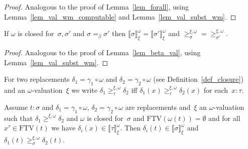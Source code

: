 \documentclass[a4paper,UKenglish,cleveref,autoref,numberwithinsect]{lipics-v2019}
\theoremstyle{definition}
\newcommand{\FTV}{\mathrm{FTV}}
\newcommand{\val}[3]{\ensuremath{\llbracket#1\rrbracket_{#2}^{#3}}}
\newcommand{\gteq}[3]{\ensuremath{\ge_{#1}^{#2,#3}}}
\begin{document}
\begin{proof}
  Analogous to the proof of Lemma~\ref{lem_forall}, using
  Lemma~\ref{lem_val_wm_computable} and Lemma~\ref{lem_val_subst_wm}.
\end{proof}

\begin{lemma}\label{lem_beta_val_wm}
  If $\omega$ is closed for~$\sigma,\sigma'$ and $\sigma =_\beta
  \sigma'$ then $\val{\sigma}{\xi}{\omega} =
  \val{\sigma'}{\xi}{\omega}$ and ${\gteq{\sigma}{\xi}{\omega}} =
      {\gteq{\sigma'}{\xi}{\omega}}$.
\end{lemma}

\begin{proof}
  Analogous to the proof of Lemma~\ref{lem_beta_val}, using
  Lemma~\ref{lem_val_subst_wm}.
\end{proof}

For two replacements $\delta_1 = \gamma_1 \circ \omega$ and $\delta_2
= \gamma_2 \circ \omega$ (see Definition~\ref{def_closure}) and an
$\omega$-valuation~$\xi$ we write $\delta_1 \gteq{\tau}{\xi}{\omega}
\delta_2$ iff $\delta_1(x) \gteq{\tau}{\xi}{\omega} \delta_2(x)$ for
each~$x : \tau$.

\begin{lemma}\label{lem_typable_wm_computable}
  Assume $t : \sigma$ and $\delta_1=\gamma_1\circ\omega$,
  $\delta_2=\gamma_2\circ\omega$ are replacements and~$\xi$ an
  $\omega$-valuation such that $\delta_1 \gteq{}{\xi}{\omega}
  \delta_2$ and $\omega$ is closed for~$\sigma$ and $\FTV(\omega(t)) =
  \emptyset$ and for all $x^\tau \in \FTV(t)$ we have $\delta_i(x) \in
  \val{\tau}{\xi}{\omega}$. Then $\delta_i(t) \in
  \val{\sigma}{\xi}{\omega}$ and $\delta_1(t)
  \gteq{\sigma}{\xi}{\omega} \delta_2(t)$.
\end{lemma}
\end{document}
